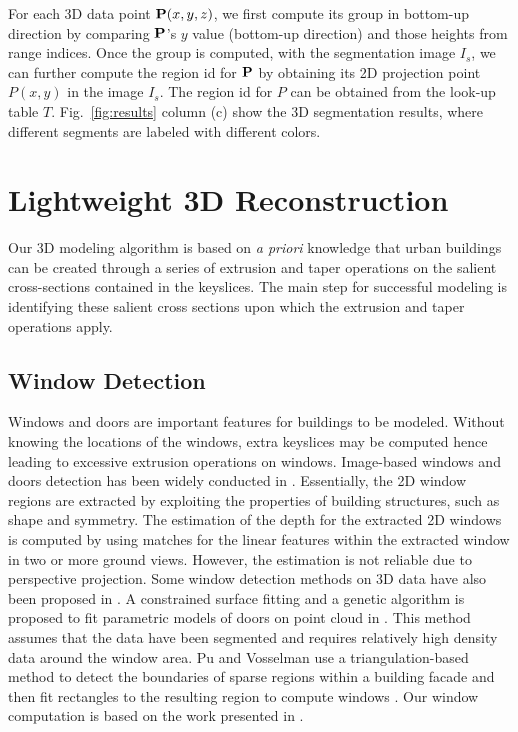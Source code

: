 \documentclass[10pt,journal,cspaper,compsoc]{IEEEtran}
\newcommand{\Fig}[1]{Fig.~\ref{fig:#1}}
\begin{document}
For each 3D data point ${\bf P}(x, y, z)$, 
we first compute its group in bottom-up direction
by comparing ${\bf P}$'s $y$ value (bottom-up direction) and 
those heights from range indices.
Once the group is computed, with the segmentation image $I_s$, 
we can further compute the region id for ${\bf P}$ by
obtaining its 2D projection point $P(x, y)$ in the image $I_s$. 
The region id for $P$ can be obtained from the look-up table $T$.
\Fig{results} column (c) show the 3D segmentation results,
where different segments are labeled with different colors.

\section{Lightweight 3D Reconstruction}
\label{sec:reconst}
Our 3D modeling algorithm is based on \emph{a priori} knowledge that
urban buildings can be created through a series of extrusion and taper
operations on the salient cross-sections contained in the keyslices.
The main step for successful modeling is identifying these salient cross
sections upon which the extrusion and taper operations apply.

\subsection{Window Detection}
\label{sec:wdd}
Windows and doors are important features for buildings to be modeled.
Without knowing the locations of the windows, extra keyslices may be computed 
hence leading to excessive extrusion operations on windows.
Image-based windows and doors detection has been widely conducted in 
\cite{WDD_LN,WDD_TKKJ}.
Essentially, the 2D window regions are extracted by exploiting the properties
of building structures, such as shape and symmetry. 
The estimation of the depth for the extracted 2D windows is computed 
by using matches for the linear features within the extracted
window in two or more ground views.
However, the estimation is not reliable due to perspective projection.
Some window detection methods on 3D data have also been proposed in
\cite{WDD_SV,WDD_BBH}.
A constrained surface fitting and a genetic algorithm 
is proposed to fit parametric models of doors on point cloud in \cite{WDD_FF}.
This method assumes that the data have been segmented 
and requires relatively high density data around the window area.
Pu and Vosselman use a triangulation-based method 
to detect the boundaries of sparse regions within a building facade 
and then fit rectangles to the resulting region to compute windows \cite{WDD_PV}.
Our window computation is based on the work presented in \cite{WDD_PV}.
\end{document}
